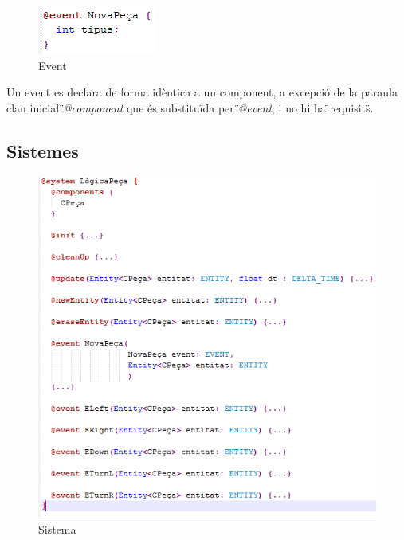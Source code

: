 
\begin{figure}[h!]
  \includegraphics{./img/ExempleEvent.png}
  \caption{Event}
\end{figure}

Un event es declara de forma idèntica a un component, a excepció de la paraula clau inicial {\em \"{}@component\"{}} que és substituïda per {\em \"{}@event\"{}}; i no hi ha \"{}requisits\"{}.

\subsection{Sistemes}

%  
%  
%  
%  
%  
%  
%  
%  
%  
%  
%  

\begin{figure}[h!]
  \includegraphics{./img/ExempleSystem.png}
  \caption{Sistema}
\end{figure}

